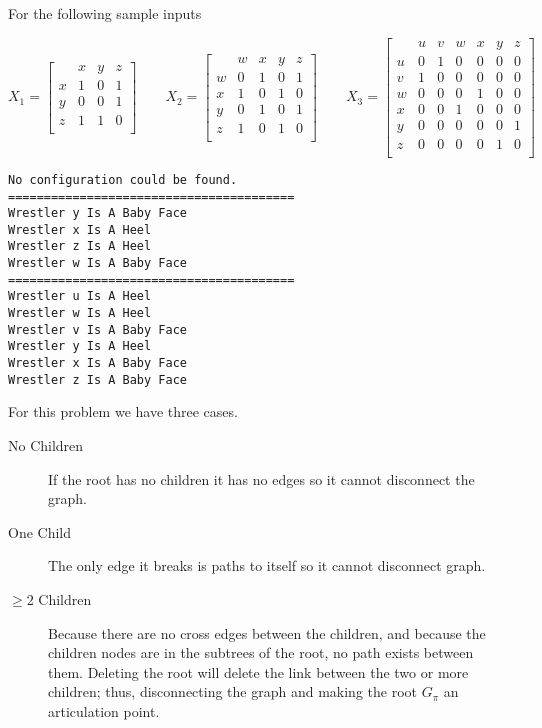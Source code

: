 \documentclass[12pt]{scrartcl}
\begin{document}
For the following sample inputs

\begin{equation*}
    X_1 = \begin{bmatrix}
          & x & y & z \\
        x & 1 & 0 & 1 \\
        y & 0 & 0 & 1 \\
        z & 1 & 1 & 0 \\
    \end{bmatrix} \qquad
    X_2 = \begin{bmatrix}
          & w & x & y & z \\
        w & 0 & 1 & 0 & 1 \\
        x & 1 & 0 & 1 & 0 \\
        y & 0 & 1 & 0 & 1 \\
        z & 1 & 0 & 1 & 0 \\
    \end{bmatrix}\qquad
    X_3= \begin{bmatrix}
          & u & v & w & x & y & z \\
        u & 0 & 1 & 0 & 0 & 0 & 0 \\
        v & 1 & 0 & 0 & 0 & 0 & 0 \\
        w & 0 & 0 & 0 & 1 & 0 & 0 \\
        x & 0 & 0 & 1 & 0 & 0 & 0 \\
        y & 0 & 0 & 0 & 0 & 0 & 1 \\
        z & 0 & 0 & 0 & 0 & 1 & 0 \\
    \end{bmatrix}
\end{equation*}

\begin{lstlisting}
No configuration could be found.
========================================
Wrestler y Is A Baby Face
Wrestler x Is A Heel
Wrestler z Is A Heel
Wrestler w Is A Baby Face
========================================
Wrestler u Is A Heel
Wrestler w Is A Heel
Wrestler v Is A Baby Face
Wrestler y Is A Heel
Wrestler x Is A Baby Face
Wrestler z Is A Baby Face
\end{lstlisting}

\problem{}
\subproblem{} %
For this problem we have three cases.

\begin{description}
    \item[No Children] If the root has no children
 it has no edges so it cannot disconnect the graph.
    \item[One Child] The only edge it breaks is paths to itself
 so it cannot disconnect graph.
    \item[$\mathit{\geq 2}$ Children] Because there are no cross edges between the children, and because the children nodes are in the subtrees of the root, no path exists between them. Deleting the root will delete the link between the two or more children; thus, disconnecting the graph and making the root $G_\pi$ an articulation point.
\end{description}
\end{document}
